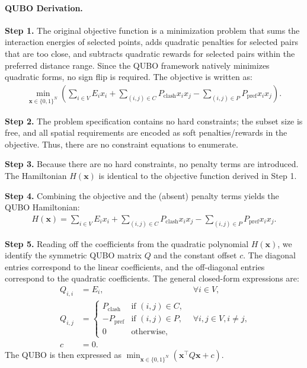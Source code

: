 \documentclass[12pt]{article}
\begin{document}
\paragraph{QUBO Derivation.}
\textbf{Step 1.} The original objective function is a minimization problem that sums the interaction energies of selected points, adds quadratic penalties for selected pairs that are too close, and subtracts quadratic rewards for selected pairs within the preferred distance range. Since the QUBO framework natively minimizes quadratic forms, no sign flip is required. The objective is written as:
\begin{align}
    \min_{\mathbf{x} \in \{0,1\}^N} \left( \sum_{i \in V} E_i x_i + \sum_{(i,j) \in C} P_{\text{clash}} x_i x_j - \sum_{(i,j) \in P} P_{\text{pref}} x_i x_j \right).
\end{align}

\textbf{Step 2.} The problem specification contains no hard constraints; the subset size is free, and all spatial requirements are encoded as soft penalties/rewards in the objective. Thus, there are no constraint equations to enumerate.

\textbf{Step 3.} Because there are no hard constraints, no penalty terms are introduced. The Hamiltonian $H(\mathbf{x})$ is identical to the objective function derived in Step 1.

\textbf{Step 4.} Combining the objective and the (absent) penalty terms yields the QUBO Hamiltonian:
\begin{align}
    H(\mathbf{x}) = \sum_{i \in V} E_i x_i + \sum_{(i,j) \in C} P_{\text{clash}} x_i x_j - \sum_{(i,j) \in P} P_{\text{pref}} x_i x_j.
\end{align}

\textbf{Step 5.} Reading off the coefficients from the quadratic polynomial $H(\mathbf{x})$, we identify the symmetric QUBO matrix $Q$ and the constant offset $c$. The diagonal entries correspond to the linear coefficients, and the off-diagonal entries correspond to the quadratic coefficients. The general closed-form expressions are:
\begin{align}
    Q_{i,i} &= E_i, & \forall i \in V, \\
    Q_{i,j} &= \begin{cases}
        P_{\text{clash}} & \text{if } (i,j) \in C, \\
        -P_{\text{pref}} & \text{if } (i,j) \in P, \\
        0 & \text{otherwise},
    \end{cases} & \forall i,j \in V, i \neq j, \\
    c &= 0.
\end{align}
The QUBO is then expressed as $\min_{\mathbf{x} \in \{0,1\}^N} \left( \mathbf{x}^\top Q \mathbf{x} + c \right)$.
\end{document}

